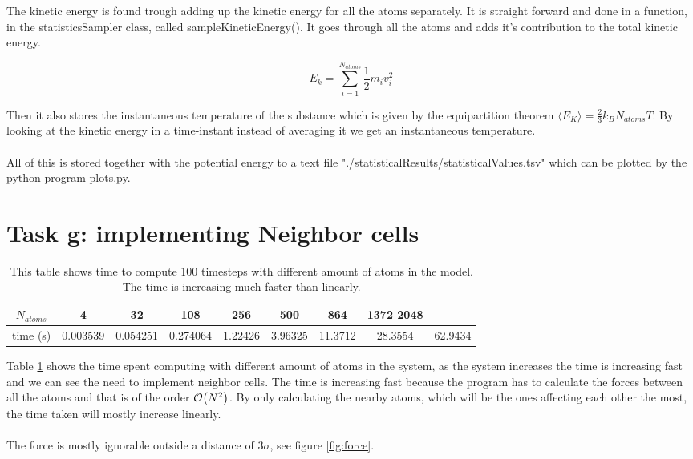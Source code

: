 \documentclass[11pt]{article}
\begin{document}
		The kinetic energy is found trough adding up the kinetic energy for all the atoms separately. It is straight forward and done in a function, in the statisticsSampler class, called sampleKineticEnergy(). It goes through all the atoms and adds it's contribution to the total kinetic energy. 

		\[
		E_k = \sum\limits^{N_{atoms}}_{i=1}{\frac{1}{2}m_i v_i^2}
		\]

		\noindent Then it also stores the instantaneous temperature of the substance which is given by the equipartition theorem \( \langle E_K \rangle = \frac{2}{3} k_B N_{atoms} T \). By looking at the kinetic energy in a time-instant instead of averaging it we get an instantaneous temperature.
\\ \\
		\noindent All of this is stored together with the potential energy to a text file "./statisticalResults/statisticalValues.tsv" which can be plotted by the python program plots.py.

\section{Task g: implementing Neighbor cells}
	\begin{table}
		\begin{tabular}{| c | c | c | c | c | c | c | c | c |}
		\hline
			\(N_{atoms}\)	&	4 			&	32			&	108			&	256		&	500		&	864		& 1372		2048
			\\ \hline
			time (s)		&	0.003539	&	0.054251	&	0.274064	&	1.22426	&	3.96325	&	11.3712	& 28.3554	& 62.9434 
			\\ \hline
		\end{tabular}
	\label{tab:time_spent}
	\caption{This table shows time to compute 100 timesteps with different amount of atoms in the model. The time is increasing much faster than linearly.}
	\end{table}

	Table \ref{tab:time_spent} shows the time spent computing with different amount of atoms in the system, as the system increases the time is increasing fast and we can see the need to implement neighbor cells. The time is increasing fast because the program has to calculate the forces between all the atoms and that is of the order \(\order{N^2}\). By only calculating the nearby atoms, which will be the ones affecting each other the most, the time taken will mostly increase linearly.
\\ \\
	\noindent The force is mostly ignorable outside a distance of \(3 \sigma \), see figure \ref{fig:force}.
\end{document}
